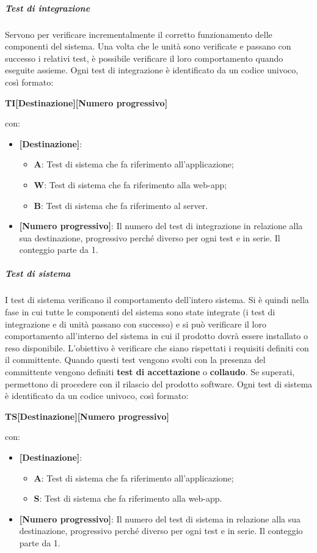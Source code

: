 \subparagraph*{Test di integrazione} 
Servono per verificare incrementalmente il corretto funzionamento delle componenti del sistema.
Una volta che le unità sono verificate e passano con successo i relativi test, è possibile verificare il loro comportamento quando eseguite assieme.
Ogni test di integrazione è identificato da un codice univoco, così formato:
\begin{center}
	\item \textbf{TI[Destinazione][Numero progressivo]}
\end{center}
con:
\begin{itemize}
	\item \textbf{[Destinazione]}:
	\begin{itemize}
		\item \textbf{A}: Test di sistema che fa riferimento all'applicazione;
		\item \textbf{W}: Test di sistema che fa riferimento alla web-app;
		\item \textbf{B}: Test di sistema che fa riferimento al server.
	\end{itemize}
	\item \textbf{[Numero progressivo]}: Il numero del test di integrazione in relazione alla sua destinazione, progressivo perché diverso per ogni test e in serie. Il conteggio parte da 1.
\end{itemize}

\subparagraph*{Test di sistema} 
I test di sistema verificano il comportamento dell’intero sistema.
Si è quindi nella fase in cui tutte le componenti del sistema sono state integrate (i test di integrazione e di unità passano con successo) e si può verificare il loro comportamento all’interno del sistema in cui il prodotto dovrà essere installato o reso disponibile.
L'obiettivo è verificare che siano rispettati i requisiti definiti con il committente.
Quando questi test vengono svolti con la presenza del committente vengono definiti \textbf{test di accettazione} o \textbf{collaudo}. Se superati, permettono di procedere con il rilascio del prodotto software.
Ogni test di sistema è identificato da un codice univoco, così formato:
\begin{center}
    	\item \textbf{TS[Destinazione][Numero progressivo]}
\end{center}
con:
\begin{itemize}
    \item \textbf{[Destinazione]}:
    \begin{itemize}
        \item \textbf{A}: Test di sistema che fa riferimento all'applicazione;
        \item \textbf{S}: Test di sistema che fa riferimento alla web-app.
    \end{itemize}
    \item \textbf{[Numero progressivo]}: Il numero del test di sistema in relazione alla sua destinazione, progressivo perché diverso per ogni test e in serie. Il conteggio parte da 1.
\end{itemize}

